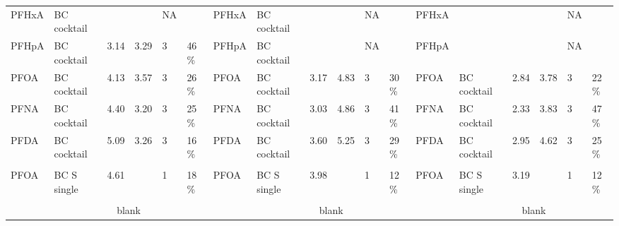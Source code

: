\begin{sidewaystable}
{\begin{threeparttable}
\begin{tabular}{llllllllllllllllll}
PFHxA    & BC cocktail   &        &           & NA &                                & PFHxA    & BC cocktail   &        &           & NA &                                & PFHxA    &               &        &           & NA &                                \\
PFHpA    & BC cocktail   & 3.14   & 3.29      & 3  & 46 \%                          & PFHpA    & BC cocktail   &        &           & NA &                                & PFHpA    &               &        &           & NA &                                \\
PFOA     & BC cocktail   & 4.13   & 3.57      & 3  & 26 \%                          & PFOA     & BC cocktail   & 3.17   & 4.83      & 3  & 30 \%                          & PFOA     & BC cocktail   & 2.84   & 3.78      & 3  & 22 \%                          \\
PFNA     & BC cocktail   & 4.40   & 3.20      & 3  & 25 \%                          & PFNA     & BC cocktail   & 3.03   & 4.86      & 3  & 41 \%                          & PFNA     & BC cocktail   & 2.33   & 3.83      & 3  & 47 \%                          \\
PFDA     & BC cocktail   & 5.09   & 3.26      & 3  & 16 \%                          & PFDA     & BC cocktail   & 3.60   & 5.25      & 3  & 29 \%                          & PFDA     & BC cocktail   & 2.95   & 4.62      & 3  & 25 \%                          \\
         &                &        &           &    &                                &          &                &        &           &    &                                &          &                &        &           &    &                                \\
PFOA     & BC S single    & 4.61   &           & 1  & 18 \%                          & PFOA     & BC S single    & 3.98   &           & 1  & 12 \%                          & PFOA     & BC S single    & 3.19   &           & 1  & 12 \%                          \\ \midrule
         &                &        &           &    &                                &          &                &        &           &    &                                &          &                &        &           &    &                                \\
         & \multicolumn{5}{c}{blank}                                                 &          & \multicolumn{5}{c}{blank}                                                 &          & \multicolumn{5}{c}{blank}                                                 \\

\end{tabular}
\end{threeparttable}}
\end{sidewaystable}
